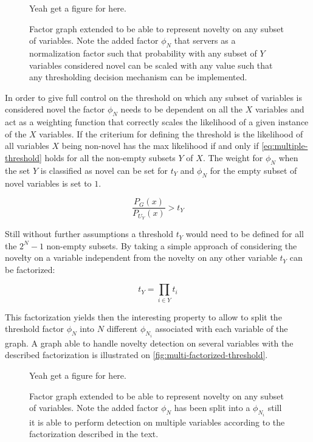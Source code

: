 \begin{figure}[h]
\centering
Yeah get a figure for here.
\caption{\label{fig:multiple-big-threshold}Factor graph extended to be able to
         represent novelty on any subset of variables. Note the added factor
         $\phi_N$ that servers as a normalization factor such that probability
         with any subset of $Y$ variables considered novel can be scaled with
         any value such that any thresholding decision mechanism can be
         implemented.}
\end{figure}

In order to give full control on the threshold on which any subset of
variables is considered novel the factor $\phi_N$ needs to be dependent on all
the $X$ variables and act as a weighting function that correctly scales the
likelihood of a given instance of the $X$ variables.
If the criterium for defining the threshold is the likelihood of all variables
$X$ being non-novel has the max likelihood if and only if
\autoref{eq:multiple-threshold} holds for all the non-empty subsets $Y$ of $X$.
The weight for $\phi_N$ when the set $Y$ is classified as novel
can be set for $t_Y$ and $\phi_N$ for the empty subset of novel variables is set
to $1$.

\begin{equation}
\label{eq:multiple-threshold}
\frac{P_G(x)}{P_{U_Y}(x)} > t_Y
\end{equation}

Still without further assumptions a threshold $t_Y$ would need to be defined for
all the $2^N-1$ non-empty subsets.
By taking a simple approach of considering the novelty on a variable independent
from the novelty on any other variable $t_Y$ can be factorized:

\begin{equation}
t_Y = \prod_{i \in Y}{t_i}
\end{equation}

This factorization yields then the interesting property to allow to split the
threshold factor $\phi_N$ into $N$ different $\phi_{N_i}$ associated with each
variable of the graph. A graph able to handle novelty detection on several
variables with the described factorization is illustrated on
\autoref{fig:multi-factorized-threshold}.

\begin{figure}[h]
\centering
Yeah get a figure for here.
\caption{\label{fig:multi-factorized-threshold}Factor graph extended to be able
         to represent novelty on any subset of variables. Note the added factor
         $\phi_N$ has been split into a $\phi_{N_i}$ still it is able to perform
         detection on multiple variables according to the factorization
         described in the text.}
\end{figure}


